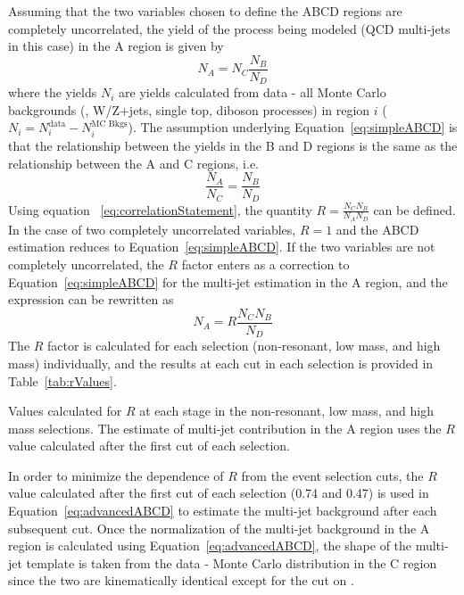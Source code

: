 Assuming that the two variables chosen to define the ABCD regions are completely uncorrelated, the yield of the process being modeled (QCD multi-jets in this case) in the A region is given by \begin{equation}
N_{A} = N_C \frac{N_B}{N_D}
\label{eq:simpleABCD}
\end{equation}
where the yields $N_i$ are yields calculated from data - all Monte Carlo backgrounds (\ttbar, W/Z+jets, single top, diboson processes) in region $i$ ($N_i = N_i^{\text{data}} - N_i^{\text{MC Bkgs}}$). The assumption underlying Equation~\ref{eq:simpleABCD} is that the relationship between the yields in the B and D regions is the same as the relationship between the A and C regions, i.e. 
\begin{equation}
\frac{N_{A}}{N_{C}} = \frac{N_B}{N_D}
\label{eq:correlationStatement}
\end{equation}
Using equation ~\ref{eq:correlationStatement}, the quantity $R= \frac{N_{C} N_B}{N_{A} N_D}$ can be defined. In the case of two completely uncorrelated variables, $R=1$ and the ABCD estimation reduces to Equation~\ref{eq:simpleABCD}. If the two variables are not completely uncorrelated, the $R$ factor enters as a correction to Equation~\ref{eq:simpleABCD} for the multi-jet estimation in the A region, and the expression can be rewritten as
\begin{equation}
N_{A} = R \frac{N_C N_B}{N_D}
\label{eq:advancedABCD}
\end{equation}
The $R$ factor is calculated for each selection (non-resonant, low mass, and high mass) individually, and the results at each cut in each selection is provided in Table~\ref{tab:rValues}.

\begin{table}[h!]
\centering

\caption{Values calculated for $R$ at each stage in the non-resonant,
  low mass, and high mass selections. The estimate of multi-jet
  contribution in the A region uses the $R$ value calculated after the
  first cut of each selection.} \label{tab:rValues}
\end{table}
In order to minimize the dependence of $R$ from the event selection cuts, the $R$ value calculated after the first cut of each selection (0.74 and 0.47) is used in Equation~\ref{eq:advancedABCD} to estimate the multi-jet background after each subsequent cut. Once the normalization of the multi-jet background in the A region is calculated using Equation~\ref{eq:advancedABCD}, the shape of the multi-jet template is taken from the data - Monte Carlo distribution in the C region since the two are kinematically identical except for the cut on \dsig.

